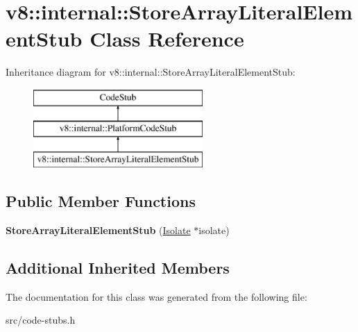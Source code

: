 \hypertarget{classv8_1_1internal_1_1_store_array_literal_element_stub}{}\section{v8\+:\+:internal\+:\+:Store\+Array\+Literal\+Element\+Stub Class Reference}
\label{classv8_1_1internal_1_1_store_array_literal_element_stub}
Inheritance diagram for v8\+:\+:internal\+:\+:Store\+Array\+Literal\+Element\+Stub\+:\begin{figure}[H]
\begin{center}
\leavevmode
\includegraphics[height=3.000000cm]{classv8_1_1internal_1_1_store_array_literal_element_stub}
\end{center}
\end{figure}
\subsection*{Public Member Functions}
\begin{DoxyCompactItemize}
\item 
\hypertarget{classv8_1_1internal_1_1_store_array_literal_element_stub_a53080e1093aa91c602cea2f456b66629}{}{\bfseries Store\+Array\+Literal\+Element\+Stub} (\hyperlink{classv8_1_1internal_1_1_isolate}{Isolate} $\ast$isolate)\label{classv8_1_1internal_1_1_store_array_literal_element_stub_a53080e1093aa91c602cea2f456b66629}

\end{DoxyCompactItemize}
\subsection*{Additional Inherited Members}


The documentation for this class was generated from the following file\+:\begin{DoxyCompactItemize}
\item 
src/code-\/stubs.\+h\end{DoxyCompactItemize}
